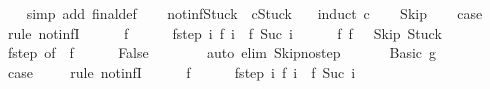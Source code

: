 \begin{isabellebody}
\ \ \isamarkupfalse%
\ {\isacharparenleft}simp\ add{\isacharcolon}\ final{\isacharunderscore}def{\isacharparenright}\isanewline
\ \ \isamarkupfalse%
%
\endisatagproof
{\isafoldproof}%
%
\isadelimproof
\isanewline
%
\endisadelimproof
\isanewline
{}\isamarkupfalse%
\ not{\isacharunderscore}inf{\isacharunderscore}Stuck{\isacharcolon}\ {\isachardoublequoteopen}{\isasymnot}\ {\isasymGamma}{\isasymturnstile}{\isacharparenleft}c{\isacharcomma}Stuck{\isacharparenright}\ {\isasymrightarrow}\ {\isasymdots}{\isacharparenleft}{\isasyminfinity}{\isacharparenright}{\isachardoublequoteclose}\isanewline
%
\isadelimproof
%
\endisadelimproof
%
\isatagproof
{}\isamarkupfalse%
\ {\isacharparenleft}induct\ c{\isacharparenright}\isanewline
\ \ \isamarkupfalse%
\ Skip\isanewline
\ \ \isamarkupfalse%
\ {\isacharquery}case\isanewline
\ \ \isamarkupfalse%
\ {\isacharparenleft}rule\ not{\isacharunderscore}infI{\isacharparenright}\isanewline
\ \ \ \ \isamarkupfalse%
\ f\isanewline
\ \ \ \ \isamarkupfalse%
\ f{\isacharunderscore}step{\isacharcolon}\ {\isachardoublequoteopen}{\isasymAnd}i{\isachardot}\ {\isasymGamma}{\isasymturnstile}f\ i\ {\isasymrightarrow}\ f\ {\isacharparenleft}Suc\ i{\isacharparenright}{\isachardoublequoteclose}\isanewline
\ \ \ \ \isamarkupfalse%
\ f{\isacharunderscore}{}{\isacharcolon}\ {\isachardoublequoteopen}f\ {}\ {\isacharequal}\ {\isacharparenleft}Skip{\isacharcomma}\ Stuck{\isacharparenright}{\isachardoublequoteclose}\ \isanewline
\ \ \ \ \isamarkupfalse%
\ f{\isacharunderscore}step\ {\isacharbrackleft}of\ {}{\isacharbrackright}\ f{\isacharunderscore}{}\isanewline
\ \ \ \ \isamarkupfalse%
\ False\isanewline
\ \ \ \ \ \ \isamarkupfalse%
\ {\isacharparenleft}auto\ elim{\isacharcolon}\ Skip{\isacharunderscore}no{\isacharunderscore}step{\isacharparenright}\isanewline
\ \ \isamarkupfalse%
\isanewline
{}\isamarkupfalse%
\isanewline
\ \ \isamarkupfalse%
\ {\isacharparenleft}Basic\ g{\isacharparenright}\ \isanewline
\ \ \isamarkupfalse%
\ {\isacharquery}case\ \isanewline
\ \ \isamarkupfalse%
\ {\isacharparenleft}rule\ not{\isacharunderscore}infI{\isacharparenright}\isanewline
\ \ \ \ \isamarkupfalse%
\ f\isanewline
\ \ \ \ \isamarkupfalse%
\ f{\isacharunderscore}step{\isacharcolon}\ {\isachardoublequoteopen}{\isasymAnd}i{\isachardot}\ {\isasymGamma}{\isasymturnstile}f\ i\ {\isasymrightarrow}\ f\ {\isacharparenleft}Suc\ i{\isacharparenright}{\isachardoublequoteclose}\isanewline

\end{isabellebody}
